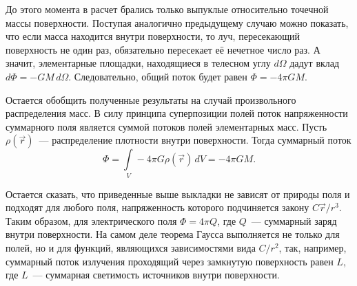 До этого момента в расчет брались только выпуклые относительно точечной массы поверхности. Поступая аналогично предыдущему случаю можно показать, что если масса находится внутри поверхности, то луч, пересекающий поверхность не один раз, обязательно пересекает её нечетное число раз. А значит, элементарные площадки, находящиеся в телесном углу $d\Omega$ дадут вклад $d\Phi = - GM \, d \Omega$. Следовательно, общий поток будет равен $\Phi = - 4 \pi GM$.

Остается обобщить полученные результаты на случай произвольного распределения масс. В силу принципа суперпозиции полей поток напряженности суммарного поля является суммой потоков полей элементарных масс. Пусть $\rho(\vec r)$~--- распределение плотности внутри поверхности. Тогда суммарный поток
\begin{equation*}
	\Phi = \int\limits_V -4\pi G \rho(\vec r) \, d V = -4 \pi GM.
\end{equation*}

Остается сказать, что приведенные выше выкладки не зависят от природы поля и подходят для любого поля, напряженность которого подчиняется закону $C\vec{r}/r^3$. Таким образом, для электрического поля $\Phi = 4\pi Q$, где $Q$~--- суммарный заряд внутри поверхности. На самом деле теорема Гаусса выполняется не только для полей, но и для функций, являющихся зависимостями вида $C/r^2$, так, например, суммарный поток излучения проходящий через замкнутую поверхность равен $L$, где $L$~--- суммарная светимость источников внутри поверхности.
